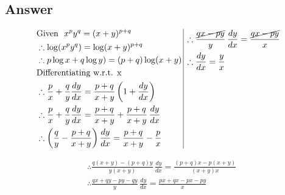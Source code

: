 \documentclass[17pt]{extarticle}
\begin{document}
\begin{fleqn}
\subsection*{Answer}
\begin{equation} \nonumber
\begin{alignedat}{4}
& \text{Given \ } x^py^q = (x+y)^{p+q} \\
& \therefore \log (x^py^q) = \log (x+y)^{p+q} \\
& \therefore p\log x + q\log y) = (p+q)\log (x+y) \\
& \text{Differentiating w.r.t. x \ }\\
& \therefore \frac{p}{x}+\frac{q}{y}\frac{dy}{dx} = \frac{p+q}{x+y}\left( 1+\frac{dy}{dx}\right)\\
& \therefore \frac{p}{x}+\frac{q}{y}\frac{dy}{dx} = \frac{p+q}{x+y} + \frac{p+q}{x+y}\,\frac{dy}{dx}\\
& \therefore \left( \frac{q}{y}-\frac{p+q}{x+y} \right)  \frac{dy}{dx} = \frac{p+q}{x+y} - \frac{p}{x}\\
\end{alignedat}
\,
\vrule
\, 
\begin{alignedat}{4}
& \therefore \frac{\cancel{qx - py}}{y} \,  \frac{dy}{dx} =  \frac{\cancel{qx - py}}{x}\\
& \therefore \frac{dy}{dx}=\frac{y}{x}\\
& \\
& \\
& \\
& \\
& \\
& \\
\end{alignedat}
\end{equation}

\begin{equation} \nonumber
\begin{alignedat}{4}
& \therefore \frac{q(x+y) - (p+q)y}{y(x+y)} \,  \frac{dy}{dx} = \frac{(p+q)x - p(x+y)}{(x+y)x}\\
& \therefore \frac{qx + qy - py - qy}{y} \,  \frac{dy}{dx} = \frac{px + qx - px - py}{x}\\
\end{alignedat}
\end{equation}



\end{fleqn}
\end{document}
